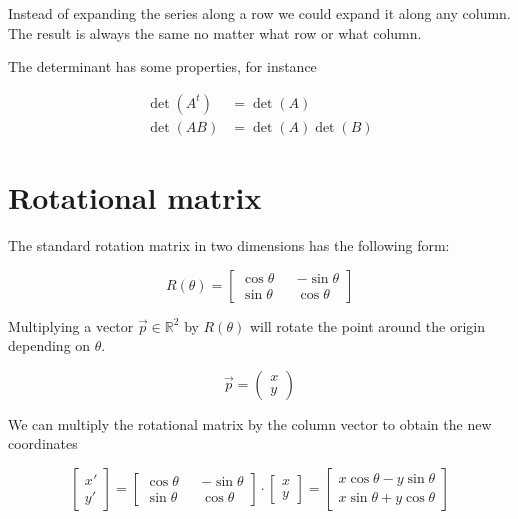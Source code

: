 \documentclass{article}
\begin{document}
Instead of expanding the series along a row we could expand it along any column. \\
The result is always the same no matter what row or what column.

The determinant has some properties, for instance

\begin{align*}
    \det(A^t)&=\det(A) \\
    \det(AB)&=\det(A)\det(B)
\end{align*}



\pagebreak

\section{Rotational matrix}

The standard rotation matrix in two dimensions has the following form:

\[
    R(\theta)=
    \begin{bmatrix} 
        \cos\theta && -\sin\theta \\
        \sin\theta && \cos\theta
    \end{bmatrix}
\]

Multiplying a vector \(\vec{p}\in \mathbb{R}^2\) by \(R(\theta)\) will rotate the point around the origin depending on \(\theta\).

\[
    \vec{p}=
    \begin{pmatrix} 
        x \\
        y
    \end{pmatrix}
\]

We can multiply the rotational matrix by the column vector to obtain the new coordinates

\[
    \begin{bmatrix} 
        x' \\
        y'
    \end{bmatrix}
    =
    \begin{bmatrix} 
        \cos\theta && -\sin\theta \\
        \sin\theta && \cos\theta
    \end{bmatrix}
    \cdot
    \begin{bmatrix} 
        x \\
        y
    \end{bmatrix}
    =
    \begin{bmatrix} 
        x\cos\theta - y\sin\theta \\
        x\sin\theta + y\cos\theta
    \end{bmatrix}
\]
\end{document}
